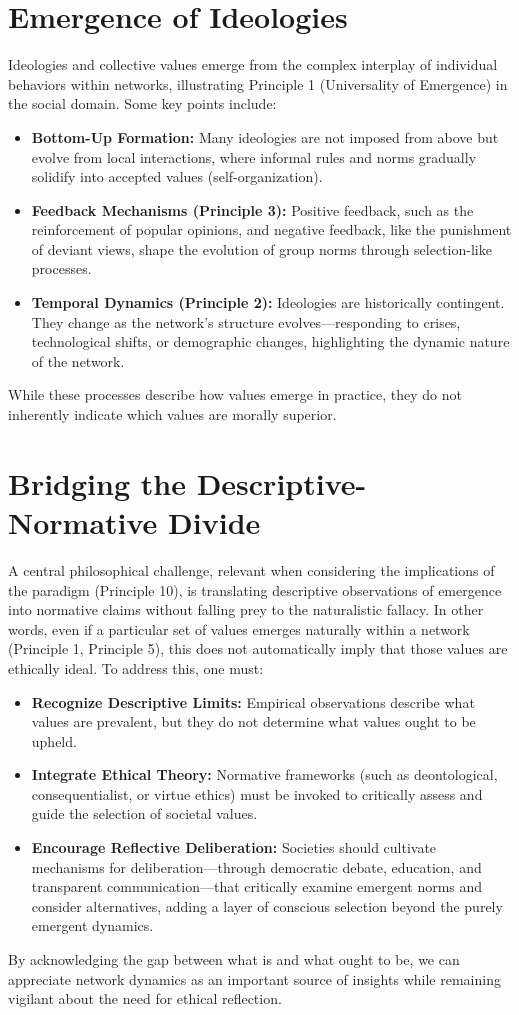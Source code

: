 \section{Emergence of Ideologies}
Ideologies and collective values emerge from the complex interplay of individual behaviors within networks, illustrating Principle 1 (Universality of Emergence) in the social domain. Some key points include:
\begin{itemize}
    \item \textbf{Bottom-Up Formation:} Many ideologies are not imposed from above but evolve from local interactions, where informal rules and norms gradually solidify into accepted values (self-organization).
    \item \textbf{Feedback Mechanisms (Principle 3):} Positive feedback, such as the reinforcement of popular opinions, and negative feedback, like the punishment of deviant views, shape the evolution of group norms through selection-like processes.
    \item \textbf{Temporal Dynamics (Principle 2):} Ideologies are historically contingent. They change as the network’s structure evolves—responding to crises, technological shifts, or demographic changes, highlighting the dynamic nature of the network.
\end{itemize}
While these processes describe how values emerge in practice, they do not inherently indicate which values are morally superior.

\section{Bridging the Descriptive-Normative Divide}
A central philosophical challenge, relevant when considering the implications of the paradigm (Principle 10), is translating descriptive observations of emergence into normative claims without falling prey to the naturalistic fallacy. In other words, even if a particular set of values emerges naturally within a network (Principle 1, Principle 5), this does not automatically imply that those values are ethically ideal. To address this, one must:
\begin{itemize}
    \item \textbf{Recognize Descriptive Limits:} Empirical observations describe what values are prevalent, but they do not determine what values ought to be upheld.
    \item \textbf{Integrate Ethical Theory:} Normative frameworks (such as deontological, consequentialist, or virtue ethics) must be invoked to critically assess and guide the selection of societal values.
    \item \textbf{Encourage Reflective Deliberation:} Societies should cultivate mechanisms for deliberation—through democratic debate, education, and transparent communication—that critically examine emergent norms and consider alternatives, adding a layer of conscious selection beyond the purely emergent dynamics.
\end{itemize}
By acknowledging the gap between what is and what ought to be, we can appreciate network dynamics as an important source of insights while remaining vigilant about the need for ethical reflection. %

